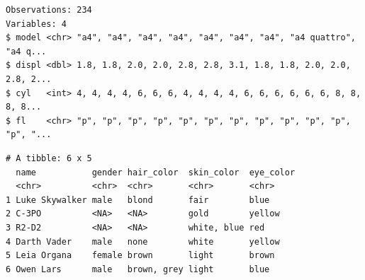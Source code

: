 \documentclass[
  11pt,
]{krantz}
\newenvironment{Shaded}{\begin{snugshade}}{\end{snugshade}}
\newcommand{\CommentTok}[1]{\textcolor[rgb]{0.37,0.37,0.37}{\textit{#1}}}
\newcommand{\KeywordTok}[1]{\textcolor[rgb]{0.27,0.27,0.27}{\textbf{#1}}}
\newcommand{\NormalTok}[1]{#1}
\newcommand{\OperatorTok}[1]{\textcolor[rgb]{0.43,0.43,0.43}{\textbf{#1}}}
\newcommand{\StringTok}[1]{\textcolor[rgb]{0.5,0.5,0.5}{#1}}
\begin{document}
\begin{Shaded}
\end{Shaded}

\begin{verbatim}
Observations: 234
Variables: 4
$ model <chr> "a4", "a4", "a4", "a4", "a4", "a4", "a4", "a4 quattro", "a4 q...
$ displ <dbl> 1.8, 1.8, 2.0, 2.0, 2.8, 2.8, 3.1, 1.8, 1.8, 2.0, 2.0, 2.8, 2...
$ cyl   <int> 4, 4, 4, 4, 6, 6, 6, 4, 4, 4, 4, 6, 6, 6, 6, 6, 6, 8, 8, 8, 8...
$ fl    <chr> "p", "p", "p", "p", "p", "p", "p", "p", "p", "p", "p", "p", "...
\end{verbatim}

\begin{Shaded}
\end{Shaded}

\begin{verbatim}
# A tibble: 6 x 5
  name           gender hair_color  skin_color  eye_color
  <chr>          <chr>  <chr>       <chr>       <chr>    
1 Luke Skywalker male   blond       fair        blue     
2 C-3PO          <NA>   <NA>        gold        yellow   
3 R2-D2          <NA>   <NA>        white, blue red      
4 Darth Vader    male   none        white       yellow   
5 Leia Organa    female brown       light       brown    
6 Owen Lars      male   brown, grey light       blue     
\end{verbatim}

\begin{Shaded}
\end{Shaded}
\end{document}
